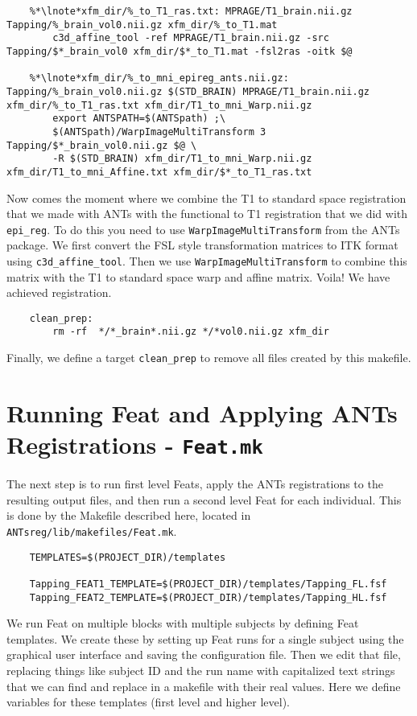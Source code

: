 \begin{lstlisting}
	%*\lnote*xfm_dir/%_to_T1_ras.txt: MPRAGE/T1_brain.nii.gz Tapping/%_brain_vol0.nii.gz xfm_dir/%_to_T1.mat
		c3d_affine_tool -ref MPRAGE/T1_brain.nii.gz -src Tapping/$*_brain_vol0 xfm_dir/$*_to_T1.mat -fsl2ras -oitk $@

	%*\lnote*xfm_dir/%_to_mni_epireg_ants.nii.gz: Tapping/%_brain_vol0.nii.gz $(STD_BRAIN) MPRAGE/T1_brain.nii.gz xfm_dir/%_to_T1_ras.txt xfm_dir/T1_to_mni_Warp.nii.gz
		export ANTSPATH=$(ANTSpath) ;\
		$(ANTSpath)/WarpImageMultiTransform 3 Tapping/$*_brain_vol0.nii.gz $@ \
		-R $(STD_BRAIN) xfm_dir/T1_to_mni_Warp.nii.gz xfm_dir/T1_to_mni_Affine.txt xfm_dir/$*_to_T1_ras.txt
\end{lstlisting}
Now comes the moment where we combine the T1 to standard space
registration that we made with ANTs with the functional to T1
registration that we did with \texttt{epi_reg}. To do this you need to
use \texttt{WarpImageMultiTransform} from the ANTs
package. \lnum{10} We first convert the FSL style transformation matrices to ITK
format using \texttt{c3d_affine_tool}. \lnum{11} Then we use
\texttt{WarpImageMultiTransform} to combine this matrix with the T1 to
standard space warp and affine matrix. Voila! We have achieved
registration. 

\begin{lstlisting}
	clean_prep:
		rm -rf  */*_brain*.nii.gz */*vol0.nii.gz xfm_dir
\end{lstlisting}

Finally, we define a target \texttt{clean_prep} to remove all files
created by this makefile.


\section{Running Feat and Applying ANTs Registrations -
  \texttt{Feat.mk}}
The next step is to run first level Feats, apply the ANTs
registrations to the resulting output files, and then run a second
level Feat for each individual. This is done by the Makefile described
here, located in \texttt{ANTsreg/lib/makefiles/Feat.mk}.

\begin{lstlisting}
	TEMPLATES=$(PROJECT_DIR)/templates

	Tapping_FEAT1_TEMPLATE=$(PROJECT_DIR)/templates/Tapping_FL.fsf
	Tapping_FEAT2_TEMPLATE=$(PROJECT_DIR)/templates/Tapping_HL.fsf	
\end{lstlisting}

We run Feat on multiple blocks with multiple subjects by defining Feat
templates. We create these by setting up Feat runs for a single
subject using the graphical user interface and saving the
configuration file. Then we edit that file, replacing things like
subject ID and the run name with capitalized text strings that we can
find and replace in a makefile with their real values. Here we define
variables for these templates (first level and higher level).


